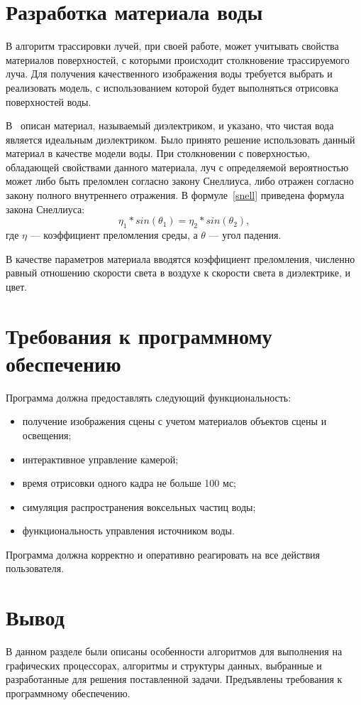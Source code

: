 \section{Разработка материала воды}

В алгоритм трассировки лучей, при своей работе, может учитывать 
свойства материалов поверхностей, с которыми происходит столкновение 
трассируемого луча. Для получения качественного изображения воды требуется выбрать 
и реализовать модель, с использованием которой будет выполняться отрисовка 
поверхностей воды.

В~\cite{RTW} описан материал, называемый диэлектриком, и указано, что
чистая вода является идеальным диэлектриком. Было принято решение использовать
данный материал в качестве модели воды. При столкновении с поверхностью, обладающей
свойствами данного материала, луч с определяемой вероятностью может
либо быть преломлен согласно закону Снеллиуса, либо отражен согласно закону 
полного внутреннего отражения. В формуле~\ref{snell} приведена формула закона
Снеллиуса:
\begin{equation}
    \label{snell}
    \eta_1 * sin(\theta_1) = \eta_2 * sin(\theta_2),
\end{equation}
где $\eta$ --- коэффициент преломления среды, а $\theta$ --- угол падения. 

В качестве параметров материала вводятся коэффициент преломления, численно равный 
отношению скорости света в воздухе к скорости света в диэлектрике, и цвет. 

\section{Требования к программному обеспечению}

Программа должна предоставлять следующий функциональность:
\begin{itemize}
    \item получение изображения сцены с учетом материалов объектов сцены и освещения;
    \item интерактивное управление камерой;
    \item время отрисовки одного кадра не больше 100 мс;
    \item симуляция распространения воксельных частиц воды;
    \item функциональность управления источником воды.
\end{itemize}

Программа должна корректно и оперативно реагировать на все действия пользователя.

\section*{Вывод}

В данном разделе были описаны особенности алгоритмов для выполнения
на графических процессорах, алгоритмы и структуры данных, выбранные 
и разработанные для решения поставленной задачи. Предъявлены требования 
к программному обеспечению.
